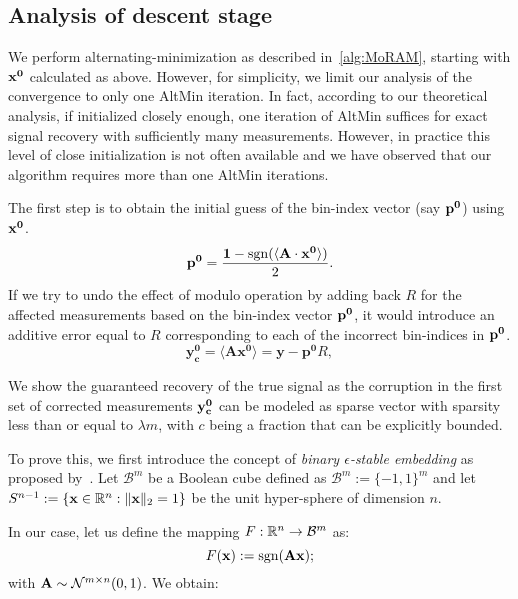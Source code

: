 \subsection{Analysis of descent stage}
We perform alternating-minimization as described in~\ref{alg:MoRAM}, starting with $\mathbf{x^0}$ calculated as above. However, for simplicity, we limit our analysis of the convergence to only one AltMin iteration. In fact, according to our theoretical analysis, if initialized closely enough, one iteration of AltMin suffices for exact signal recovery with sufficiently many measurements. However, in practice this level of close initialization is not often available and we have observed that our algorithm requires more than one AltMin iterations. %

The first step is to obtain the initial guess of the bin-index vector (say $\mathbf{p^0}$) using $\mathbf{x^0}$.
$$
\mathbf{{p}^{0}} = \frac{\mathbf{1}-\mathrm{sgn}(\langle \mathbf{A} \cdot \mathbf{x^0} \rangle)}{2}.
$$
If we try to undo the effect of modulo operation by adding back $R$ for the affected measurements based on the bin-index vector $\mathbf{p^0}$, it would introduce an additive error equal to $R$ corresponding to each of the incorrect bin-indices in $\mathbf{p^0}$.
$$
\mathbf{y^0_c} = \langle \mathbf{A}\mathbf{x^{0}} \rangle = \mathbf{y} - \mathbf{p^0}R,
$$

We show the guaranteed recovery of the true signal as the corruption in the first set of corrected measurements $\mathbf{y_c^0}$ can be modeled as sparse vector with sparsity less than or equal to $\lambda m$, with $c$ being a fraction that can be explicitly bounded.

To prove this, we first introduce the concept of \emph{binary $\epsilon$-stable embedding} as proposed by~\cite{Jacques2013}. Let $\mathcal{B}^m$ be a Boolean cube defined as $\mathcal{B}^m := \{-1,1\}^m$ and let $S^{n-1}:=\{\mathbf{x}\in {\mathbb{R}}^n : \|\mathbf{x}\|_2 = 1\}$ be the unit hyper-sphere of dimension $n$.


In our case, let us define the mapping $F: {\mathbb{R}}^n \rightarrow \mathcal{B}^m$ as:
$$
F(\mathbf{x}):= \mathrm{sgn}(\mathbf{Ax});
$$
with $\mathbf{A} \sim \mathcal{N}^{m \times n}(0,1)$. We obtain:

